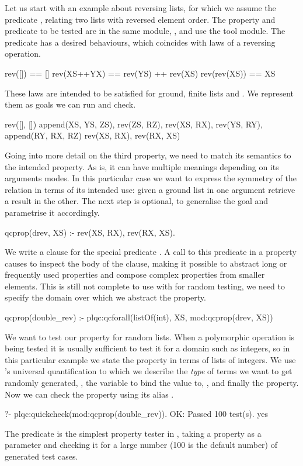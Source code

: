 Let us start with an example about reversing lists, for which we assume the
predicate , relating two lists with reversed element order.
%
The property and predicate to be tested are in the same module,
, and use the \plqc{} tool module.
%
The  predicate has a desired behaviours, which
coincides with laws of a reversing operation.
{
\begin{code}
      rev([])   == []
  rev(XS++YX)   == rev(YS) ++ rev(XS)
  rev(rev(XS))  == XS
\end{code}
}
These laws are intended to be satisfied for ground, finite lists
 and .
%
We represent them as \Prolog{} goals we can run and check.
%
\begin{yapcode}
 rev([], [])
 append(XS, YS, ZS), rev(ZS, RZ),
  rev(XS, RX), rev(YS, RY),
   append(RY, RX, RZ)
 rev(XS, RX), rev(RX, XS)
\end{yapcode}
%
Going into more detail on the third property, we need to match its
semantics to the intended property.
%
As is, it can have multiple meanings depending on its arguments modes.
%
In this particular case we want to express the symmetry of the
 relation in terms of its intended use: given a ground
list in one argument retrieve a result in the other.
%
The next step is optional, to generalise the goal and parametrise it
accordingly.
%
\begin{yapcode}
 qcprop({drev, XS}) :-
   rev(XS, RX), rev(RX, XS).
\end{yapcode}
%
We write a clause for the special predicate .
%
A call to this predicate in a property causes \plqc{} to inspect the
body of the clause, making it possible to abstract long or frequently
used properties and compose complex properties from smaller elements.
%
This is still not complete to use with \plqc{} for random testing, we
need to specify the domain over which we abstract the property.
%
\begin{yapcode}
 qcprop(double_rev) :-
   plqc:qcforall(listOf(int), XS,
                 mod:qcprop({drev, XS}))
\end{yapcode}
%
We want to test our  property for random  lists.
%
When a polymorphic operation is being tested it is usually sufficient
to test it for a domain such as integers, so in this particular example
we state the property in terms of lists of integers.
%
We use \plqc{}'s universal quantification to which we describe the
\emph{type} of terms we want to get randomly generated,
, the variable to bind the value to, ,
and finally the property.
%
Now we can check the property using its alias .
\begin{yapcode}
   ?- plqc:quickcheck(mod:qcprop(double_rev)).
 OK: Passed 100 test(s).
 yes
\end{yapcode}
%
The  predicate is the simplest property tester in
\plqc{}, taking a property as a parameter and checking it for a large
number (100 is the default number) of generated test cases.


